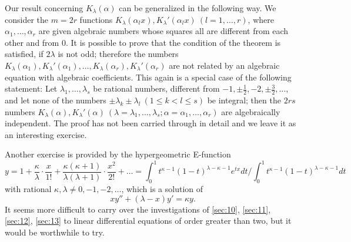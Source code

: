 Our result concerning $K_\lambda(\alpha)$ can be generalized in the following way. We consider the $m=2r$ functions $K_\lambda(\alpha_l x), K_\lambda'(\alpha_l x) \ (l=1,\dots,r)$, where $\alpha_1, \dots, \alpha_r$ are given algebraic numbers whose squares all are different from each other and from $0$. It is possible to prove that the condition of the theorem is satisfied, if $2\lambda$ is not odd; therefore the numbers $K_\lambda(\alpha_1), K_\lambda'(\alpha_1), \dots, K_\lambda(\alpha_r), K_\lambda'(\alpha_r)$ are not related by an algebraic equation with algebraic coefficients. This again is a special case of the following statement: Let $\lambda_1, \dots, \lambda_s$ be rational numbers, different from $-1, \pm \frac{1}{2}, -2, \pm \frac{3}{2}, \dots$, and let none of the numbers $\pm \lambda_k \pm \lambda_l \ (1 \le k < l \le s)$ be integral; then the $2rs$ numbers $K_\lambda(\alpha), K_\lambda'(\alpha) \ (\lambda = \lambda_1, \dots, \lambda_s; \alpha = \alpha_1, \dots, \alpha_r)$ are algebraically independent. The proof has not been carried through in detail and we leave it as an interesting exercise.

Another exercise is provided by the hypergeometric E-function
\[y = 1 + \frac{\kappa}{\lambda} \cdot \frac{x}{1!} + \frac{\kappa(\kappa+1)}{\lambda(\lambda+1)} \cdot \frac{x^2}{2!} + \dots = \int_0^1 t^{\kappa-1} (1-t)^{\lambda-\kappa-1} e^{tx} dt \Big/ \int_0^1 t^{\kappa-1} (1-t)^{\lambda-\kappa-1} dt\]
with rational $\kappa, \lambda \neq 0, -1, -2, \dots$, which is a solution of
\[x y'' + (\lambda - x) y' = \kappa y.\]
It seems more difficult to carry over the investigations of \autoref{sec:10}, \autoref{sec:11}, \autoref{sec:12}, \autoref{sec:13} to linear differential equations of order greater than two, but it would be worthwhile to try.
